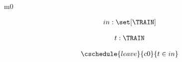 \documentclass[12pt]{amsart}
\title{}
\author{}
\date{} %
\begin{document}
\maketitle
\tableofcontents


\begin{machine}{m0}

\newset{\TRAIN}

%
	\begin{align*}
\variable{		in : \set[\TRAIN]}
	\end{align*}
%




\begin{align*}
\dummy{	t : \TRAIN}
\end{align*}

\begin{align*}
\cschedule{leave}{c0}
{	t \in in	}
\end{align*}


\end{machine}
\end{document}

